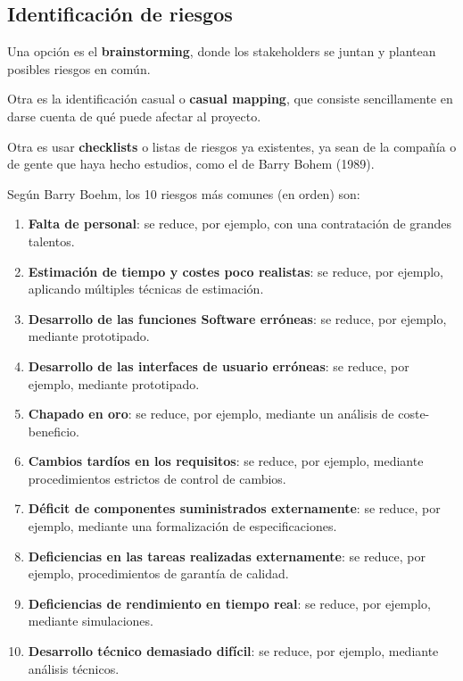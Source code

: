 \documentclass[12pt]{article}
\begin{document}
\subsection{Identificación de riesgos}
\label{7.5.0}

{Una opción es el \textbf{brainstorming}, donde los stakeholders se juntan y plantean posibles riesgos en común.} \bigskip

{Otra es la identificación casual o \textbf{casual mapping}, que consiste sencillamente en darse cuenta de qué puede afectar al proyecto.} \bigskip

{Otra es usar \textbf{checklists} o listas de riesgos ya existentes, ya sean de la compañía o de gente que haya hecho estudios, como el de Barry Bohem (1989).}

\newpage
{Según Barry Boehm, los 10 riesgos más comunes (en orden) son:}

\begin{enumerate}
    \item {\textbf{Falta de personal}: se reduce, por ejemplo, con una contratación de grandes talentos.}
    \item {\textbf{Estimación de tiempo y costes poco realistas}: se reduce, por ejemplo, aplicando múltiples técnicas de estimación.}
    \item {\textbf{Desarrollo de las funciones Software erróneas}: se reduce, por ejemplo, mediante prototipado.}
    \item {\textbf{Desarrollo de las interfaces de usuario erróneas}: se reduce, por ejemplo, mediante prototipado.}
    \item {\textbf{Chapado en oro}: se reduce, por ejemplo, mediante un análisis de coste-beneficio.}
    \item {\textbf{Cambios tardíos en los requisitos}: se reduce, por ejemplo, mediante procedimientos estrictos de control de cambios.}
    \item {\textbf{Déficit de componentes suministrados externamente}: se reduce, por ejemplo, mediante una formalización de especificaciones.}
    \item {\textbf{Deficiencias en las tareas realizadas externamente}: se reduce, por ejemplo, procedimientos de garantía de calidad.}
    \item {\textbf{Deficiencias de rendimiento en tiempo real}: se reduce, por ejemplo, mediante simulaciones.}
    \item {\textbf{Desarrollo técnico demasiado difícil}: se reduce, por ejemplo, mediante análisis técnicos.}
\end{enumerate}
\end{document}
